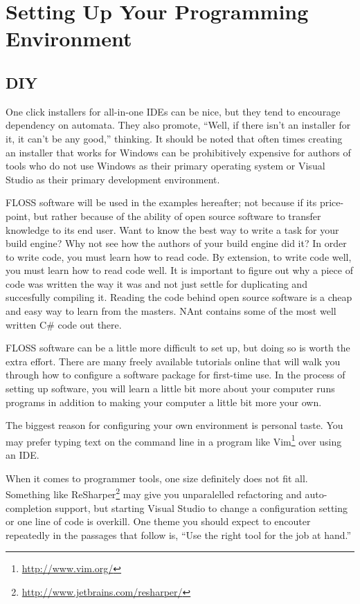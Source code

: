 
\chapter{Setting Up Your Programming Environment}

\section{DIY}
One click installers for all-in-one \glspl{IDE} can be nice, but they tend to encourage dependency on automata. They also promote, ``Well, if there 
isn't an installer for it, it can't be any good,'' thinking. It should be noted that often times creating an installer that works for Windows can be
prohibitively expensive for authors of tools who do not use Windows as their primary operating system or Visual Studio as their primary development 
environment.

\gls{FLOSS} software will be used in the examples hereafter; not because if its price-point, but rather because of the ability of open source software
to transfer knowledge to its end user. Want to know the best way to write a task for your build engine? Why not see how the authors of your build
engine did it? In order to write code, you must learn how to read code. By extension, to write code well, you must learn how to read code well. It is 
important to figure out why a piece of code was written the way it was and not just settle for duplicating and succesfully compiling it. Reading the 
code behind open source software is a cheap and easy way to learn from the masters. \gls{NAnt} contains some of the most well written C\# code out there.

\gls{FLOSS} software can be a little more difficult to set up, but doing so is worth the extra effort. There are many freely available tutorials
online that will walk you through how to configure a software package for first-time use. In the process of setting up software, you will learn a
little bit more about your computer runs programs in addition to making your computer a little bit more your own.

The biggest reason for configuring your own environment is personal taste. You may prefer typing text on the command line in a program like 
Vim\footnote{\url{http://www.vim.org/}} over using an \gls{IDE}.

When it comes to programmer tools, one size definitely does not fit all. Something like ReSharper\footnote{\url{http://www.jetbrains.com/resharper/}} 
may give you unparalelled \gls{refactoring} and \gls{auto-completion} support, but starting Visual Studio to change a configuration setting or one 
line of code is overkill. One theme you should expect to encouter repeatedly in the passages that follow is, 
``Use the right tool for the job at hand.''

